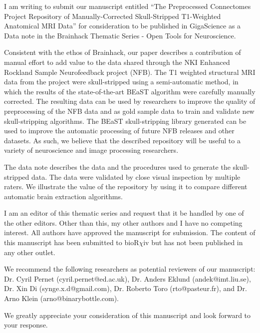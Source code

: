 \documentclass{article}
\begin{document}
\sffamily

I am writing to submit our manuscript entitled ``The Preprocessed Connectomes Project Repository of Manually-Corrected Skull-Stripped T1-Weighted Anatomical MRI Data'' for consideration to be published in GigaScience as a Data note in the Brainhack Thematic Series - Open Tools for Neuroscience.

Consistent with the ethos of Brainhack, our paper describes a contribution of manual effort to add value to the data shared through the NKI Enhanced Rockland Sample Neurofeedback project (NFB). The T1 weighted structural MRI data from the project were skull-stripped using a semi-automatic method, in which the results of the state-of-the-art BEaST algorithm were carefully manually corrected. The resulting data can be used by researchers to improve the quality of preprocessing of the NFB data and as gold sample data to train and validate new skull-stripping algorithms. The BEaST skull-stripping library generated can be used to improve the automatic processing of future NFB releases and other datasets. As such, we believe that the described repository will be useful to a variety of neuroscience and image processing researchers.

The data note describes the data and the procedures used to generate the skull-stripped data. The data were validated by close visual inspection by multiple raters. We illustrate the value of the repository by using it to compare different automatic brain extraction algorithms. 

I am an editor of this thematic series and request that it be handled by one of the other editors. Other than this, my other authors and I have no competing interest. All authors have approved the manuscript for submission. The content of this manuscript has been submitted to bioR$\chi$iv but has not been published in any other outlet.

We recommend the following researchers as potential reviewers of our manuscript: Dr. Cyril Pernet (cyril.pernet@ed.ac.uk), Dr. Anders Eklund (andek@imt.liu.se), Dr. Xin Di (synge.x.d@gmail.com), Dr. Roberto Toro (rto@pasteur.fr), and Dr. Arno Klein (arno@binarybottle.com).

We greatly appreciate your consideration of this manuscript and look forward to your response.
\end{document}
